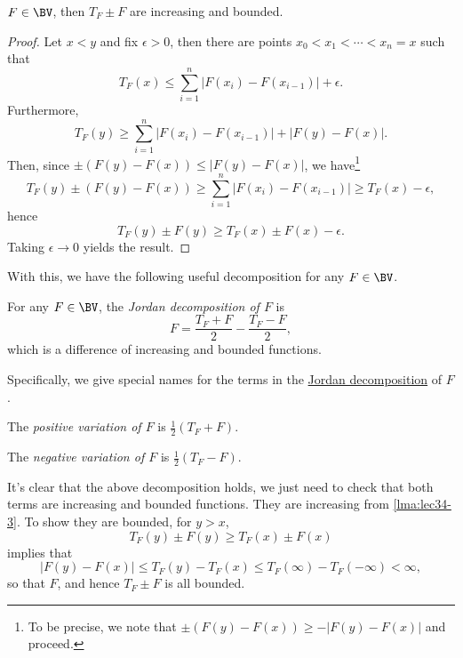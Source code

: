 \begin{lemma}\label{lma:lec34-3}
	\(F \in\BV\), then \(T_F \pm F\) are increasing and bounded.
\end{lemma}

\begin{proof}
	Let \(x < y\) and fix \(\epsilon > 0\), then there are points \(x_0 < x_1 < \cdots < x_n = x\) such that
	\[
		T_F(x) \leq \sum_{i=1}^n \left\vert F(x_i) - F(x_{i-1}) \right\vert + \epsilon.
	\]
	Furthermore,
	\[
		T_F(y) \geq \sum_{i=1}^n \left\vert F(x_i) - F(x_{i-1}) \right\vert + \left\vert F(y) - F(x) \right\vert .
	\]
	Then, since \(\pm(F(y) - F(x)) \leq \left\vert F(y) - F(x) \right\vert \), we have\footnote{To be precise, we note that \(\pm (F(y) - F(x)) \geq - \left\vert F(y) - F(x) \right\vert \) and proceed.}
	\[
		T_F(y) \pm (F(y) - F(x)) \geq \sum_{i=1}^n \left\vert F(x_i) - F(x_{i-1}) \right\vert \geq T_F(x) - \epsilon,
	\]
	hence
	\[
		T_F(y) \pm F(y) \geq T_F(x) \pm F(x) - \epsilon.
	\]
	Taking \(\epsilon \to 0\) yields the result.
\end{proof}

With this, we have the following useful decomposition for any \(F\in\BV\).
\begin{definition}\label{def:Jordan-decomposition}
	For any \(F \in\BV\), the \emph{Jordan decomposition of \(F\)} is
	\[
		F = \frac{T_F + F}{2} - \frac{T_F - F}{2},
	\]
	which is a difference of increasing and bounded functions.

	Specifically, we give special names for the terms in the \hyperref[def:Jordan-decomposition]{Jordan decomposition} of \(F\).
	\begin{definition}\label{def:positive-variation-function}
		The \emph{positive variation of \(F\)} is \(\frac{1}{2}(T_{F} +F)\).
	\end{definition}
	\begin{definition}\label{def:negative-variation-function}
		The \emph{negative variation of \(F\)} is \(\frac{1}{2}(T_{F} - F)\).
	\end{definition}
\end{definition}
\begin{explanation}
	It's clear that the above decomposition holds, we just need to check that both terms are increasing and bounded functions. They are
	increasing from \autoref{lma:lec34-3}. To show they are bounded, for \(y > x\),
	\[
		T_F(y)\pm F(y) \geq T_F(x) \pm F(x)
	\]
	implies that
	\[
		\left\vert F(y) - F(x) \right\vert \leq T_F(y) - T_{F} (x) \leq T_{F} (\infty ) - T_{F} (-\infty ) < \infty,
	\]
	so that \(F\), and hence \(T_{F} \pm F\) is all bounded.
\end{explanation}

